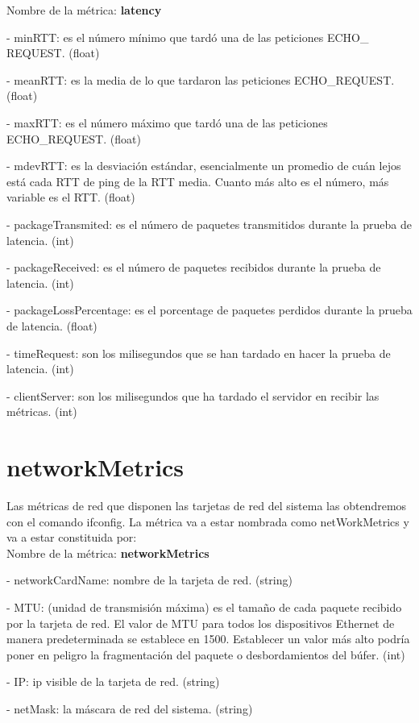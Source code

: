 \documentclass[ spanish, a4paper, 12pt, twoside]{report}
\begin{document}
Nombre de la métrica: \textbf{latency}

\hyp{} minRTT: es el número mínimo que tardó una  de las peticiones ECHO\_ REQUEST. (float)

\hyp{} meanRTT: es la media de lo que tardaron las peticiones ECHO\_REQUEST. (float)

\hyp{} maxRTT: es el número máximo que tardó una de las peticiones ECHO\_REQUEST. (float)

\hyp{} mdevRTT: es la desviación estándar, esencialmente un promedio de cuán lejos está cada RTT de ping de la RTT media. 
Cuanto más alto es el número, más variable es el RTT. (float)

\hyp{} packageTransmited: es el número de paquetes transmitidos durante la prueba de latencia. (int)

\hyp{} packageReceived: es el número de paquetes recibidos durante la prueba de latencia. (int)

\hyp{} packageLossPercentage: es el porcentage de paquetes perdidos durante la prueba de latencia. (float)

\hyp{} timeRequest: son los milisegundos que se han tardado en hacer la prueba de latencia. (int)

\hyp{} clientServer: son los milisegundos que ha tardado el servidor en recibir las métricas. (int) 

\section{networkMetrics}
Las métricas de red que disponen las tarjetas de red del sistema las obtendremos con el comando ifconfig.
La métrica va a estar nombrada como netWorkMetrics y va a estar constituida por:\\
  
Nombre de la métrica: \textbf{networkMetrics}

\hyp{} networkCardName: nombre de la tarjeta de red. (string)

\hyp{} MTU: (unidad de transmisión máxima) es el tamaño de cada paquete recibido por la tarjeta de red. El valor de MTU para todos 
los dispositivos Ethernet de manera predeterminada se establece en 1500. Establecer un valor más alto podría poner en peligro 
la fragmentación del paquete o desbordamientos del búfer. (int)

\hyp{} IP: ip visible de la tarjeta de red. (string)

\hyp{} netMask: la máscara de red del sistema. (string)
\end{document}
